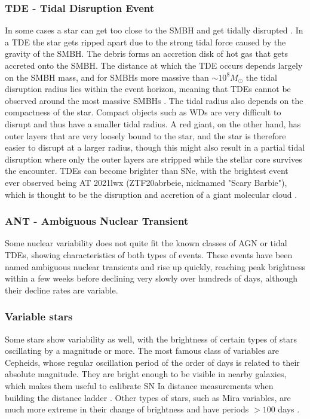\documentclass[a4paper,oneside,12pt, class=Latex/Classes/PhDthesisPSnPDF, crop=false]{standalone}
\begin{document}
\subsubsection{TDE - Tidal Disruption Event}
In some cases a star can get too close to the SMBH and get tidally disrupted \citep{Rees_1988_TDE, Strubbe_2009_TDE}. In a TDE the star gets ripped apart due to the strong tidal force caused by the gravity of the SMBH. The debris forms an accretion disk of hot gas that gets accreted onto the SMBH. The distance at which the TDE occurs depends largely on the SMBH mass, and for SMBHs more massive than $\sim10^8 M_\odot$ the tidal disruption radius lies within the event horizon, meaning that TDEs cannot be observed around the most massive SMBHs \citep{Hills_mass}. The tidal radius also depends on the compactness of the star. Compact objects such as WDs are very difficult to disrupt and thus have a smaller tidal radius. A red giant, on the other hand, has outer layers that are very loosely bound to the star, and the star is therefore easier to disrupt at a larger radius, though this might also result in a partial tidal disruption where only the outer layers are stripped while the stellar core survives the encounter. TDEs can become brighter than SNe, with the brightest event ever observed being AT 2021lwx (ZTF20abrbeie, nicknamed "Scary Barbie"), which is thought to be the disruption and accretion of a giant molecular cloud \citep{Scary_Barbie, 2021lwx_Wiseman}.


\subsubsection{ANT - Ambiguous Nuclear Transient}
Some nuclear variability does not quite fit the known classes of AGN or tidal TDEs, showing characteristics of both types of events. These events have been named ambiguous nuclear transients \citep[ANTS;][]{Kankare_ANT, 2020ohl_Hinkle, Hinkle_MIR_ANT_echo, Hinkle_Extreme_nuclear_transients/ANTs, wiseman_ztfants} and rise up quickly, reaching peak brightness within a few weeks before declining very slowly over hundreds of days, although their decline rates are variable.


\subsubsection{Variable stars}
Some stars show variability as well, with the brightness of certain types of stars oscillating by a magnitude or more. The most famous class of variables are Cepheids, whose regular oscillation period of the order of days is related to their absolute magnitude. They are bright enough to be visible in nearby galaxies, which makes them useful to calibrate SN Ia distance measurements when building the distance ladder \citep{Cepheids_Gibson, Cepheids_Saha}. Other types of stars, such as Mira variables, are much more extreme in their change of brightness and have periods $>100$ days \citep{Mira_varibs}.
\end{document}
